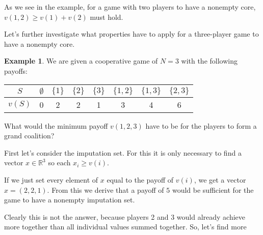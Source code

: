 \documentclass[10pt,a4paper,titlepage]{article}
\theoremstyle{plain}
\theoremstyle{definition}
\newtheorem{example}[thm]{Example} %
\begin{document}
 
  As we see in the example, for a game with two players to have a nonempty core, $v(1, 2) \geq v(1) + v(2)$ must hold.

  Let's further investigate what properties have to apply for a three-player game to have a nonempty core.

  \begin{example}
      We are given a cooperative game of $N = 3$ with the following payoffs:

      \begin{tabular}{c | c c c c c c c}
          $S$ & $\emptyset$ & $\{1\}$ & $\{2\}$ & $\{3\}$ & $\{1, 2\}$ & $\{1, 3\}$ & $\{2, 3\}$\\
          \hline
          $v(S)$ & 0 & 2 & 2 & 1 & 3 & 4 & 6
      \end{tabular}

      What would the minimum payoff $v(1, 2, 3)$ have to be for the players to form a grand coalition?

      First let's consider the imputation set. For this it is only necessary to find a vector $x \in \mathbb{R}^3$ so each $x_i \geq v(i)$.
    
      If we just set every element of $x$ equal to the payoff of $v(i)$, we get a vector $x = (2, 2, 1)$. From this we derive that a payoff of $5$ would be sufficient for the game to have a nonempty imputation set.

      Clearly this is not the answer, because players 2 and 3 would already achieve more together than all individual values summed together. So, let's find more 
  \end{example}
\end{document}
